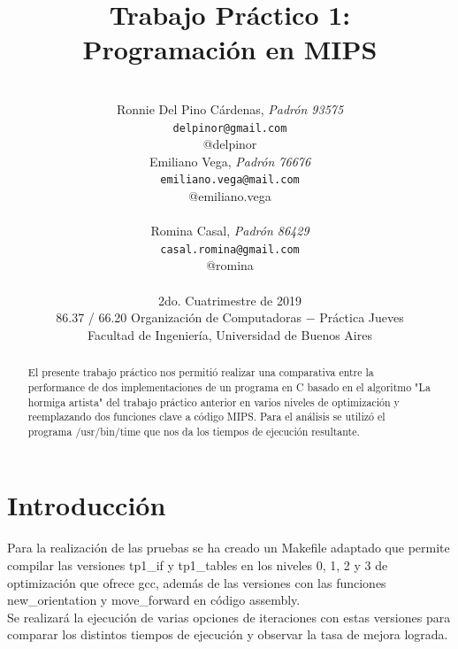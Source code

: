 \documentclass[a4paper, 10pt, twoside, notitlepage]{article}
\title{\textbf{Trabajo Práctico 1:\\Programación en MIPS} \\}
\author{ \\
         Ronnie Del Pino Cárdenas, \textit{Padrón 93575} \\
          \texttt{ delpinor@gmail.com }       \\
          @delpinor \\
		  [2.5ex]
         Emiliano Vega, \textit{Padrón 76676}     \\
          \texttt{emiliano.vega@mail.com}   \\
          @emiliano.vega   \\                 \\ 
		  [2.5ex]
	 Romina Casal, \textit{Padrón 86429} \\
          \texttt{casal.romina@gmail.com} \\
          @romina
                               \\ 
		  [2.5ex]
		 \\
         \normalsize{2do. Cuatrimestre de 2019}            \\
         \normalsize{86.37 / 66.20 Organización de Computadoras $-$ Práctica Jueves} \\
         \normalsize{Facultad de Ingeniería, Universidad de Buenos Aires} 
       }
\date{}
\begin{document}
\maketitle

\begin{abstract}
El presente trabajo práctico nos permitió realizar una comparativa entre la performance de dos implementaciones de un programa en C basado en el algoritmo "La hormiga artista" del trabajo práctico anterior en varios niveles de optimización y reemplazando dos funciones clave a código MIPS. Para el análisis se utilizó el programa /usr/bin/time que nos da los tiempos de ejecución resultante.
\end{abstract}

% 
% 

\pagestyle{fancy}
\fancyhead{}
\fancyfoot{}
\renewcommand{\sectionmark}[1]{\markright{\thesection\ #1}}
\renewcommand{\headrulewidth}{0.4pt}
\fancyhead[LE]{\nouppercase \rightmark}
\fancyhead[RE, LO]{\bf \thepage}
\fancyhead[RO]{\nouppercase \rightmark}
\fancyfoot[C]{ }
\maketitle
\setcounter{page}{1}

\parskip 7.2pt
\section{Introducción}
Para la realización de las pruebas se ha creado un Makefile adaptado que permite compilar las versiones tp1\_if y tp1\_tables en los niveles 0, 1, 2 y 3 de optimización que ofrece gcc, además de las versiones con las funciones new\_orientation y move\_forward en código assembly.\\
Se realizará la ejecución de varias opciones de iteraciones con estas versiones para comparar los distintos tiempos de ejecución y observar la tasa de mejora lograda.\\

\end{document}
